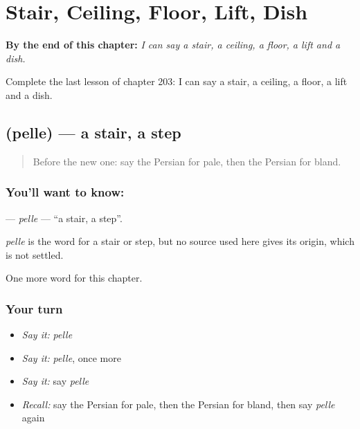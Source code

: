 
\chapter{Stair, Ceiling, Floor, Lift, Dish}
\label{ch:fa-stair-ceiling-floor-lift-dish}

\begin{chapteropening}
\textbf{By the end of this chapter:} \emph{I can say a stair, a ceiling, a floor, a lift and a dish.}

Complete the last lesson of chapter 203: I can say a stair, a ceiling, a floor, a lift and a dish.
\end{chapteropening}

\section[\texorpdfstring{\fa{پله} (pelle)}{پله (pelle)}]{ (pelle) — a stair, a step}

\label{lesson:FA-C203-pelle}



\begin{quote}
Before the new one: say the Persian for pale, then the Persian for bland.
\end{quote}

\subsection*{You'll want to know: }
\textbf{} — \emph{pelle} — \textquotedblleft{}a stair, a step\textquotedblright{}.

\begin{cousinweb}
\emph{pelle} is the word for a stair or step, but no source used here gives its origin, which is not settled.
\end{cousinweb}

\begin{grammarlens}[title={What you've built}]
One more word for this chapter.
\end{grammarlens}

\subsection*{Your turn}
\begin{itemize}
\raggedright
  \item \emph{Say it:} \emph{pelle}
  \item \emph{Say it:} \emph{pelle}, once more
  \item \emph{Say it:} say \emph{pelle}
  \item \emph{Recall:} say the Persian for pale, then the Persian for bland, then say \emph{pelle} again
\end{itemize}

